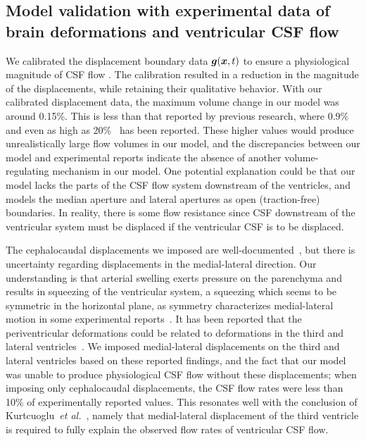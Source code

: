 \documentclass{template}
\begin{document}
\subsection{Model validation with experimental data of brain deformations and ventricular CSF flow}
We calibrated the displacement boundary data $\bm{g}(\bm{x}, t)$
to ensure a physiological magnitude of CSF flow
\cite{eide2021direction,wagshul2011pulsating}.
The calibration resulted in a reduction in the magnitude of the displacements,
while retaining their qualitative behavior. With our calibrated displacement data,
the maximum volume change in our model was around 0.15\%.
This is less than that reported by previous research,
where 0.9\%~\cite{zhu2006dynamics} and even as high as 20\%~\cite{lee1989variation}
has been reported. These higher values would produce unrealistically large flow
volumes in our model, and the discrepancies between our model and
experimental reports indicate the absence of another
volume-regulating mechanism in our model. One potential explanation could be
that our model lacks the parts of the CSF flow system downstream
of the ventricles, and models the median aperture and lateral apertures as 
open (traction-free) boundaries. In reality, there is some flow resistance
since CSF downstream of the ventricular system must be displaced
if the ventricular CSF is to be displaced. 

The cephalocaudal displacements we imposed are
well-documented~\cite{Kurtcuoglu2007ComputationalSylvius,
Enzmann1992BrainImaging, greitz1992pulsatile, soellinger2007assessment, soellinger20093d},
but there is uncertainty regarding displacements 
in the medial-lateral direction. Our understanding is
that arterial swelling exerts pressure on the parenchyma and results in
squeezing of the ventricular system, a squeezing which seems to be symmetric
in the horizontal plane, as symmetry characterizes medial-lateral motion
in some experimental reports~\cite{soellinger20093d, abderezaei2021development}.
It has been reported that the periventricular deformations could be related to
deformations in the third and lateral ventricles~\cite{abderezaei2021development}.
We imposed medial-lateral displacements on the third and lateral 
ventricles based on these reported findings, and the fact that our model
was unable to produce physiological CSF flow without these displacements;
when imposing only cephalocaudal displacements, the CSF flow rates were less than
10\% of experimentally reported values. This resonates well with the conclusion of
Kurtcuoglu~\emph{et al.}~\cite{Kurtcuoglu2007ComputationalSylvius},
namely that medial-lateral displacement of the third ventricle is
required to fully explain the observed flow rates of ventricular CSF flow.
\end{document}
